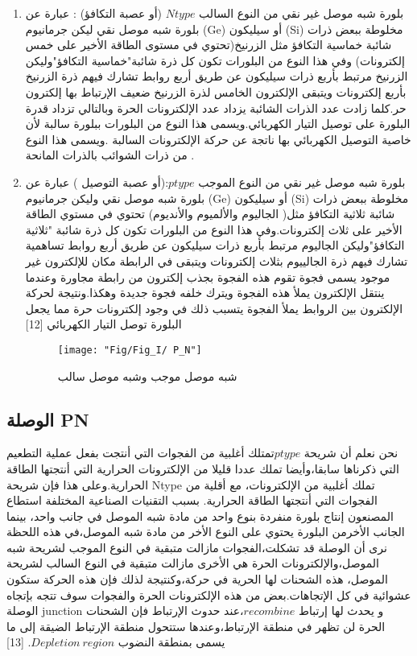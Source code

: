 	\begin{enumerate}
		
		\item   بلورة شبه موصل غير نقي من النوع السالب 
		$ N type $ (أو عصبة التكافؤ) :
		عبارة عن بلورة شبه موصل نقي  ليكن جرمانيوم (Ge) أو سيليكون (Si) مخلوطة ببعض ذرات شائبة خماسية التكافؤ مثل الزرنيخ(تحتوي في مستوى الطاقة الأخير على خمس إلكترونات) وفي هذا النوع من البلورات تكون كل ذرة شائبة"خماسية التكافؤ"وليكن الزرنيخ مرتبط بأربع ذرات سيليكون عن طريق أربع روابط تشارك فيهم ذرة الزرنيخ بأربع إلكترونات ويتبقى الإلكترون الخامس لذرة الزرنيخ ضعيف الإرتباط بها إلكترون حر.كلما زادت عدد الذرات الشائبة يزداد عدد الإلكترونات الحرة وبالتالي تزداد قدرة البلورة على توصيل التيار الكهربائي.ويسمى هذا النوع من البلورات ببلورة سالبة لأن خاصية التوصيل الكهربائي بها ناتجة عن حركة الإلكترونات السالبة .ويسمى هذا النوع من ذرات الشوائب بالذرات المانحة .
		
		\item    بلورة شبه موصل غير نقي من النوع الموجب
		$ p type $:(أو عصبة التوصيل )  
		عبارة عن بلورة شبه موصل نقي  وليكن جرمانيوم (Ge) أو سيليكون (Si) مخلوطة ببعض ذرات شائبة ثلاثية التكافؤ مثل( الجاليوم والألميوم والأنديوم) تحتوي في مستوي الطاقة الأخير على ثلاث إلكترونات.وفي هذا النوع من البلورات تكون كل ذرة شائبة "ثلاثية التكافؤ"وليكن الجاليوم مرتبط بأربع ذرات سيليكون عن طريق أربع روابط تساهمية تشارك فيهم ذرة الجالييوم بثلاث إلكترونات ويتبقى في الرابطة مكان للإلكترون غير موجود يسمى فجوة تقوم هذه الفجوة  بجذب إلكترون من رابطة مجاورة وعندما ينتقل الإلكترون يملأ هذه الفجوة ويترك خلفه فجوة جديدة وهكذا.ونتيجة لحركة الإلكترون بين الروابط يملأ الفجوة يتسبب ذلك في وجود إلكترونات حرة مما يجعل البلورة توصل التيار الكهربائي 
		[12]
		
		\begin{figure}[h!]
			\centering
			\texttt{[image: "Fig/Fig\_I/ P\_N"]}
			\caption{شبه موصل موجب وشبه موصل سالب}
			\label{fig:-pn}
		\end{figure}
		\FloatBarrier	
		
	\end{enumerate} 
	\subsection{  الوصلة  PN}
	نحن نعلم أن شريحة $ p type $تمتلك أغلبية من الفجوات التي أنتجت بفعل عملية التطعيم التي ذكرناها سابقا،وأيضا تملك عددا قليلا من الإلكترونات الحرارية التي أنتجتها الطاقة الحرارية.وعلى هذا فإن شريحة Ntype تملك أغلبية من الإلكترونات، مع أقلية من الفجوات التي أنتجتها الطاقة الحرارية.
	بسبب التقنيات الصناعية المختلفة استطاع المصنعون إنتاج بلورة منفردة بنوع واحد من مادة شبه الموصل في جانب واحد، بينما الجانب الأخرمن البلورة يحتوي على النوع الأخر من مادة شبه الموصل،في هذه اللحظة نرى أن الوصلة قد تشكلت،الفجوات مازالت متبقية في النوع الموجب لشريحة شبه الموصل،والإلكترونات الحرة هي الأخرى مازالت متبقية في النوع السالب لشريحة الموصل، هذه الشحنات لها الحرية في حركة،وكنتيجة لذلك فإن هذه الحركة ستكون عشوائية في كل الإتجاهات.بعض من هذه الإلكترونات الحرة والفجوات سوف تتجه بإتجاه الوصلة junction و يحدث لها إرتباط $ recombine $،عند حدوث الإرتباط فإن الشحنات الحرة لن تظهر في منطقة الإرتباط،وعندها ستتحول منطقة الإرتباط الضيقة إلى ما يسمى بمنطقة النضوب $ Depletion ~region $.
	[13]
